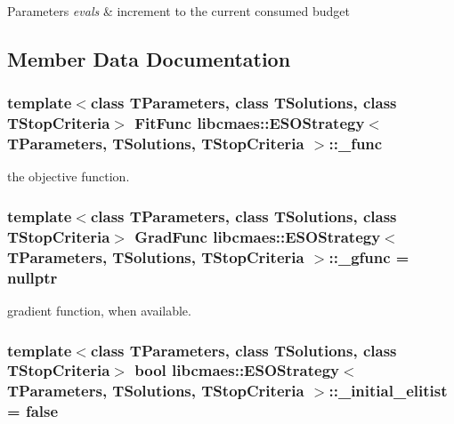 \begin{DoxyParams}{Parameters}
{\em evals} & increment to the current consumed budget \\
\hline
\end{DoxyParams}


\subsection{Member Data Documentation}
\hypertarget{classlibcmaes_1_1ESOStrategy_a1a29d4c30bbdb6021920275e81fa4dc4}{
\subsubsection[{\+\_\+func}]{\setlength{\rightskip}{0pt plus 5cm}template$<$class T\+Parameters, class T\+Solutions, class T\+Stop\+Criteria$>$ Fit\+Func {\bf libcmaes\+::\+E\+S\+O\+Strategy}$<$ T\+Parameters, T\+Solutions, T\+Stop\+Criteria $>$\+::\+\_\+func\hspace{0.3cm}{\ttfamily [protected]}}}\label{classlibcmaes_1_1ESOStrategy_a1a29d4c30bbdb6021920275e81fa4dc4}
the objective function. \hypertarget{classlibcmaes_1_1ESOStrategy_a76926e49a2ca941a22362167bc230093}{
\subsubsection[{\+\_\+gfunc}]{\setlength{\rightskip}{0pt plus 5cm}template$<$class T\+Parameters, class T\+Solutions, class T\+Stop\+Criteria$>$ Grad\+Func {\bf libcmaes\+::\+E\+S\+O\+Strategy}$<$ T\+Parameters, T\+Solutions, T\+Stop\+Criteria $>$\+::\+\_\+gfunc = nullptr\hspace{0.3cm}{\ttfamily [protected]}}}\label{classlibcmaes_1_1ESOStrategy_a76926e49a2ca941a22362167bc230093}
gradient function, when available. \hypertarget{classlibcmaes_1_1ESOStrategy_a1ee27b35458c52501bebf5bdc42de385}{
\subsubsection[{\+\_\+initial\+\_\+elitist}]{\setlength{\rightskip}{0pt plus 5cm}template$<$class T\+Parameters, class T\+Solutions, class T\+Stop\+Criteria$>$ bool {\bf libcmaes\+::\+E\+S\+O\+Strategy}$<$ T\+Parameters, T\+Solutions, T\+Stop\+Criteria $>$\+::\+\_\+initial\+\_\+elitist = false\hspace{0.3cm}{\ttfamily [protected]}}}\label{classlibcmaes_1_1ESOStrategy_a1ee27b35458c52501bebf5bdc42de385}

